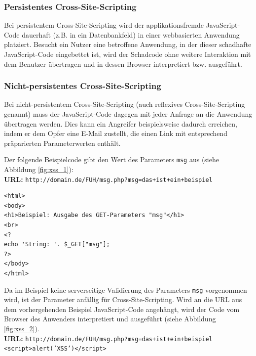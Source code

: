 \subsubsection{Persistentes Cross-Site-Scripting}

Bei persistentem Cross-Site-Scripting wird der applikationsfremde 
JavaScript-Code dauerhaft (z.B. in ein Datenbankfeld) in einer 
webbasierten Anwendung platziert. Besucht ein Nutzer eine betroffene 
Anwendung, in der dieser schadhafte JavaScript-Code eingebettet ist, 
wird der Schadcode ohne weitere Interaktion mit dem Benutzer übertragen 
und in dessen Browser interpretiert bzw. ausgeführt.

\subsubsection{Nicht-persistentes Cross-Site-Scripting}

Bei nicht-persistentem Cross-Site-Scripting (auch reflexives 
Cross-Site-Scripting genannt) muss der JavaScript-Code dagegen mit 
jeder Anfrage an die Anwendung übertragen werden. Dies kann ein 
Angreifer beispielsweise dadurch erreichen, indem er dem Opfer 
eine E-Mail zustellt, die einen Link mit entsprechend präparierten 
Parameterwerten enthält.


Der folgende Beispielcode gibt den Wert des Parameters \texttt{msg} 
aus (siehe Abbildung \ref{fig:xss_1}):
\\
\textbf{URL:} \texttt{http://domain.de/FUH/msg.php?msg=das+ist+ein+beispiel}

\begin{lstlisting}[basicstyle=\ttfamily\footnotesize]
<html>
<body>
<h1>Beispiel: Ausgabe des GET-Parameters "msg"</h1>
<br>
<?
echo 'String: '. $_GET["msg"];
?>
</body>
</html>
\end{lstlisting}

Da im Beispiel keine serverseitige Validierung des Parameters 
\texttt{msg} vorgenommen wird, ist der Parameter anfällig für 
Cross-Site-Scripting. Wird an die URL aus dem vorhergehenden 
Beispiel JavaScript-Code angehängt, wird der Code vom Browser 
des Anwenders interpretiert und ausgeführt (siehe Abbildung 
\ref{fig:xss_2}).
\\
\textbf{URL:} \texttt{http://domain.de/FUH/msg.php?msg=das+ist+ein+beispiel\\<script>alert('XSS')</script>}

